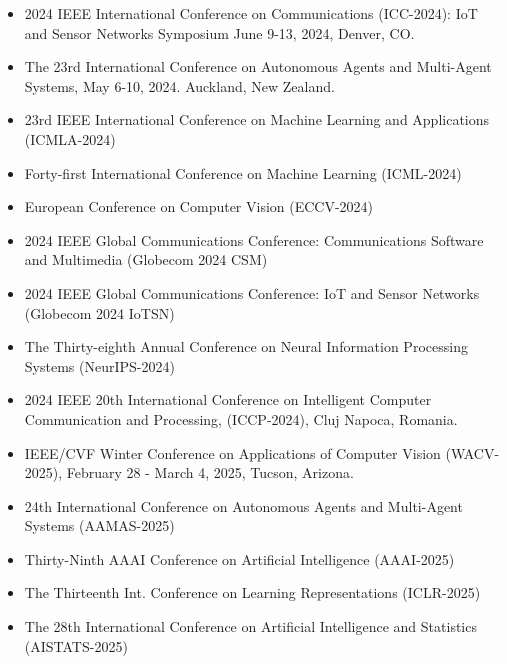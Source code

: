 \begin{itemize}

\item 2024 IEEE International Conference on Communications (ICC-2024): IoT and Sensor Networks Symposium June 9-13, 2024, Denver, CO.

\item The 23rd International Conference on Autonomous Agents and Multi-Agent Systems, May 6-10, 2024. Auckland, New Zealand.

\item 23rd IEEE International Conference on Machine Learning and Applications (ICMLA-2024)

\item Forty-first International Conference on Machine Learning (ICML-2024)

\item European Conference on Computer Vision (ECCV-2024)

\item 2024 IEEE Global Communications Conference: Communications Software and Multimedia (Globecom 2024 CSM)

\item 2024 IEEE Global Communications Conference: IoT and Sensor Networks (Globecom 2024 IoTSN)

\item The Thirty-eighth Annual Conference on Neural Information Processing Systems (NeurIPS-2024)

\item 2024 IEEE 20th International Conference on Intelligent Computer Communication and Processing, (ICCP-2024), Cluj Napoca, Romania.



\item IEEE/CVF Winter Conference on Applications of Computer Vision (WACV-2025), February 28 - March 4, 2025, Tucson, Arizona.

\item 24th International Conference on Autonomous Agents and Multi-Agent Systems (AAMAS-2025)

\item Thirty-Ninth AAAI Conference on Artificial Intelligence (AAAI-2025)

\item The Thirteenth Int. Conference on Learning Representations (ICLR-2025)

\item The 28th International Conference on Artificial Intelligence and Statistics (AISTATS-2025)


\end{itemize}
